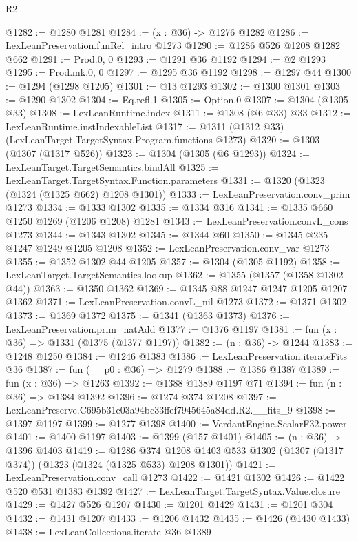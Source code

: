 \begin{lexlean}{R2}
\begin{coremodule}
@1282 := @1280 @1281
@1284 := (x : @36) -> @1276 @1282
@1286 := LexLeanPreservation.funRel_intro @1273
@1290 := @1286 @526 @1208 @1282 @662
@1291 := Prod.{0, 0}
@1293 := @1291 @36 @1192
@1294 := @2 @1293
@1295 := Prod.mk.{0, 0}
@1297 := @1295 @36 @1192
@1298 := @1297 @44
@1300 := @1294 (@1298 @1205)
@1301 := @13 @1293
@1302 := @1300 @1301
@1303 := @1290 @1302
@1304 := Eq.refl.{1}
@1305 := Option.{0}
@1307 := @1304 (@1305 @33)
@1308 := LexLeanRuntime.index
@1311 := @1308 (@6 @33) @33
@1312 := LexLeanRuntime.instIndexableList
@1317 := @1311 (@1312 @33) (LexLeanTarget.TargetSyntax.Program.functions @1273)
@1320 := @1303 (@1307 (@1317 @526))
@1323 := @1304 (@1305 (@6 @1293))
@1324 := LexLeanTarget.TargetSemantics.bindAll
@1325 := LexLeanTarget.TargetSyntax.Function.parameters
@1331 := @1320 (@1323 (@1324 (@1325 @662) @1208 @1301))
@1333 := LexLeanPreservation.conv_prim @1273
@1334 := @1333 @1302
@1335 := @1334 @316
@1341 := @1335 @660 @1250 @1269 (@1206 @1208) @1281
@1343 := LexLeanPreservation.convL_cons @1273
@1344 := @1343 @1302
@1345 := @1344 @60
@1350 := @1345 @235 @1247 @1249 @1205 @1208
@1352 := LexLeanPreservation.conv_var @1273
@1355 := @1352 @1302 @44 @1205
@1357 := @1304 (@1305 @1192)
@1358 := LexLeanTarget.TargetSemantics.lookup
@1362 := @1355 (@1357 (@1358 @1302 @44))
@1363 := @1350 @1362
@1369 := @1345 @88 @1247 @1247 @1205 @1207 @1362
@1371 := LexLeanPreservation.convL_nil @1273
@1372 := @1371 @1302
@1373 := @1369 @1372
@1375 := @1341 (@1363 @1373)
@1376 := LexLeanPreservation.prim_natAdd
@1377 := @1376 @1197
@1381 := fun (x : @36) => @1331 (@1375 (@1377 @1197))
@1382 := (n : @36) -> @1244
@1383 := @1248 @1250
@1384 := @1246 @1383
@1386 := LexLeanPreservation.iterateFits @36
@1387 := fun (__p0 : @36) => @1279
@1388 := @1386 @1387
@1389 := fun (x : @36) => @1263
@1392 := @1388 @1389 @1197 @71
@1394 := fun (n : @36) => @1384 @1392
@1396 := @1274 @374 @1208
@1397 := LexLeanPreserve.C695b31e03a94bc33ffef7945645a84dd.R2.__fits_9
@1398 := @1397 @1197
@1399 := @1277 @1398
@1400 := VerdantEngine.ScalarF32.power
@1401 := @1400 @1197
@1403 := @1399 (@157 @1401)
@1405 := (n : @36) -> @1396 @1403
@1419 := @1286
    @374
    @1208
    @1403
    @533
    @1302
    (@1307 (@1317 @374))
    (@1323 (@1324 (@1325 @533) @1208 @1301))
@1421 := LexLeanPreservation.conv_call @1273
@1422 := @1421 @1302
@1426 := @1422 @520 @531 @1383 @1392
@1427 := LexLeanTarget.TargetSyntax.Value.closure
@1429 := @1427 @526 @1207
@1430 := @1201 @1429
@1431 := @1201 @304
@1432 := @1431 @1207
@1433 := @1206 @1432
@1435 := @1426 (@1430 @1433)
@1438 := LexLeanCollections.iterate @36 @1389

\end{coremodule}
\end{lexlean}
